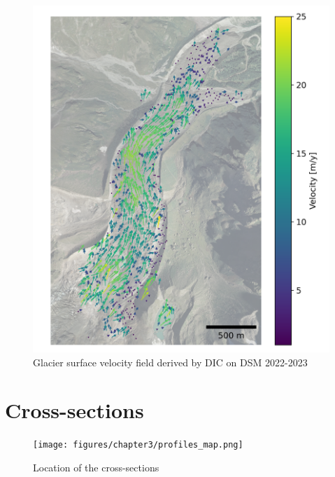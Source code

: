 \begin{figure}
    \centering
    \includegraphics[height=\textheight]{figures/chapter3/velocity_DIC_2022-2023.png}
    \caption[]{Glacier surface velocity field derived by DIC on DSM 2022-2023}
\end{figure}


\chapter{Cross-sections}\label{app:xsec}

\begin{figure}[p]
    \centering
    \texttt{[image: figures/chapter3/profiles\_map.png]}\\
    \caption[]{Location of the cross-sections}
\end{figure}

